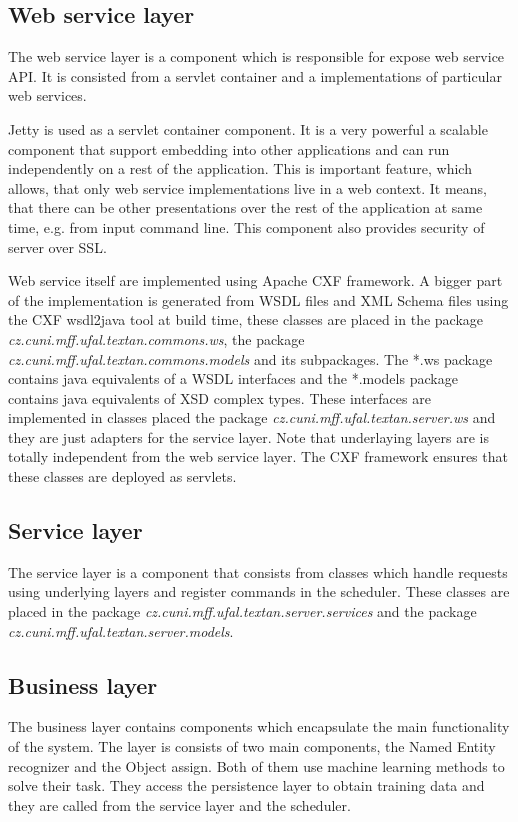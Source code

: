 \subsection{Web service layer}
The web service layer is a component which is responsible for expose web service
API. It is consisted from a servlet container and a implementations of particular
web services.

Jetty is used as a servlet container component. It is a very powerful a scalable
component that support embedding into other applications and can run independently
on a rest of the application. This is important feature, which allows, that only
web service implementations live in a web context. It means, that there can be
other presentations over the rest of the application at same time, e.g. from input
command line. This component also provides security of \textan{} server over SSL.

Web service itself are implemented using Apache CXF framework. A bigger part of
the implementation is generated from WSDL files and XML Schema files using the
CXF wsdl2java tool at build time, these classes are placed in the package
\emph{cz.\-cuni.\-mff.\-ufal.\-textan.\-commons.\-ws}, the package
\emph{cz.\-cuni.\-mff.\-ufal.\-textan.\-commons.\-models} and its subpackages.
The *.ws package contains java equivalents of a WSDL interfaces and the *.models
package contains java equivalents of XSD complex types. These interfaces are
implemented in classes placed the package \emph{cz.\-cuni.\-mff.\-ufal.\-textan.\-server.\-ws}
and they are just adapters for the service layer. Note that underlaying layers are
is totally independent from the web service layer. The CXF framework ensures that
these classes are deployed as servlets.

\subsection{Service layer}
The service layer is a component that consists from classes which handle requests
using underlying layers and register commands in the scheduler. These classes are
placed in the package \emph{cz.\-cuni.\-mff.\-ufal.\-textan.\-server.\-services}
and the package \emph{cz.\-cuni.\-mff.\-ufal.\-textan.\-server.\-models}.


\subsection{Business layer}
The business layer contains components which encapsulate the main functionality
of the system. The layer is consists of two main components, the Named Entity
recognizer and the Object assign. Both of them use machine learning methods to solve
their task. They access the persistence layer to obtain training data and they
are called from the service layer and the scheduler.


